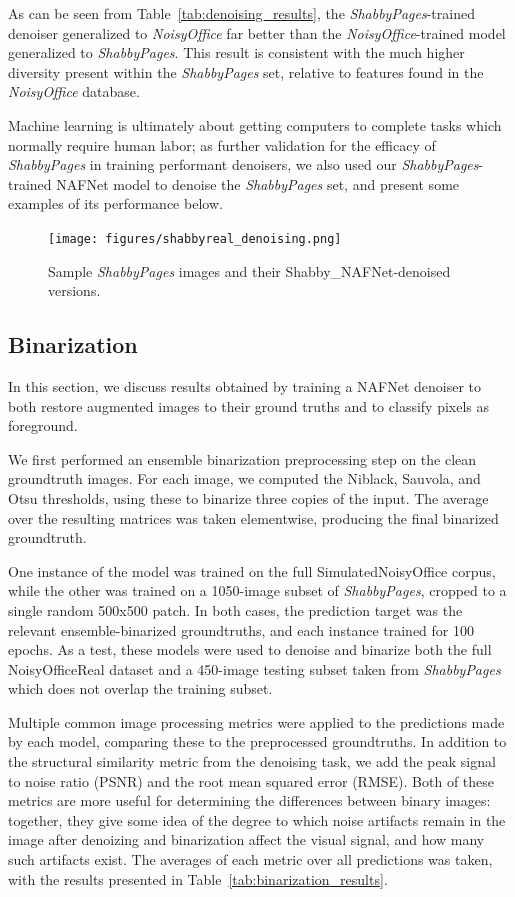 \documentclass[runningheads]{llncs}
\begin{document}
As can be seen from Table~\ref{tab:denoising_results}, the \emph{ShabbyPages}-trained denoiser generalized to \emph{NoisyOffice} far better than the \emph{NoisyOffice}-trained model generalized to \emph{ShabbyPages}. This result is consistent with the much higher diversity present within the \emph{ShabbyPages} set, relative to features found in the \emph{NoisyOffice} database.

Machine learning is ultimately about getting computers to complete tasks which normally require human labor; as further validation for the efficacy of \emph{ShabbyPages} in training performant denoisers, we also used our \emph{ShabbyPages}-trained NAFNet model to denoise the \emph{ShabbyPages} set, and present some examples of its performance below.

\begin{figure}
\centering
\texttt{[image: figures/shabbyreal\_denoising.png]}
\caption{Sample \emph{ShabbyPages} images and their Shabby\_NAFNet-denoised versions.}
\label{fig:shabbyreal_denoising}
\end{figure}

\subsection{Binarization}
In this section, we discuss results obtained by training a NAFNet denoiser to both restore augmented images to their ground truths and to classify pixels as foreground.

We first performed an ensemble binarization preprocessing step on the clean groundtruth images.
For each image, we computed the Niblack, Sauvola, and Otsu thresholds, using these to binarize three copies of the input. The average over the resulting matrices was taken elementwise, producing the final binarized groundtruth.

One instance of the model was trained on the full SimulatedNoisyOffice corpus, while the other was trained on a 1050-image subset of \emph{ShabbyPages}, cropped to a single random 500x500 patch. In both cases, the prediction target was the relevant ensemble-binarized groundtruths, and each instance trained for 100 epochs.
As a test, these models were used to denoise and binarize both the full NoisyOfficeReal dataset and a 450-image testing subset taken from \emph{ShabbyPages} which does not overlap the training subset.

Multiple common image processing metrics were applied to the predictions made by each model, comparing these to the preprocessed groundtruths.
In addition to the structural similarity metric from the denoising task, we add the peak signal to noise ratio (PSNR) and the root mean squared error (RMSE). Both of these metrics are more useful for determining the differences between binary images: together, they give some idea of the degree to which noise artifacts remain in the image after denoizing and binarization affect the visual signal, and how many such artifacts exist.
The averages of each metric over all predictions was taken, with the results presented in Table~\ref{tab:binarization_results}.
\end{document}
